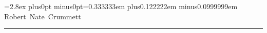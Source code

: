 



\frenchspacing
{}

\def\fontspacing{\baselineskip=2.8ex plus0pt minus0pt\spaceskip=0.333333em plus0.122222em minus0.0999999em}

\twentyrm
\fontspacing
\noindent
Robert~Nate~Crummett

\kern2pt
\hrule height 1pt
\smallskip



\bye
